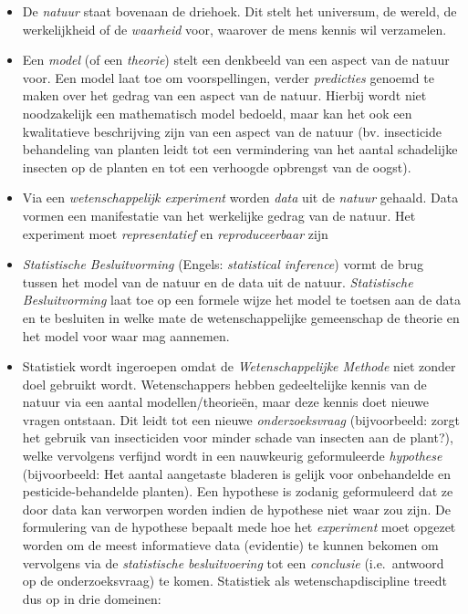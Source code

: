 \documentclass[
  dutch,
  letterpaper,
  12pt]{book}
\theoremstyle{definition}
\theoremstyle{definition}
\theoremstyle{definition}
\theoremstyle{remark}
\begin{document}
\begin{itemize}
\item
  De \emph{natuur} staat bovenaan de driehoek. Dit stelt het universum,
  de wereld, de werkelijkheid of de \emph{waarheid} voor, waarover de
  mens kennis wil verzamelen.
\item
  Een \emph{model} (of een \emph{theorie}) stelt een denkbeeld van een
  aspect van de natuur voor. Een model laat toe om voorspellingen,
  verder \emph{predicties} genoemd te maken over het gedrag van een
  aspect van de natuur. Hierbij wordt niet noodzakelijk een mathematisch
  model bedoeld, maar kan het ook een kwalitatieve beschrijving zijn van
  een aspect van de natuur (bv. insecticide behandeling van planten
  leidt tot een vermindering van het aantal schadelijke insecten op de
  planten en tot een verhoogde opbrengst van de oogst).
\item
  Via een \emph{wetenschappelijk experiment} worden \emph{data} uit de
  \emph{natuur} gehaald. Data vormen een manifestatie van het werkelijke
  gedrag van de natuur. Het experiment moet \emph{representatief} en
  \emph{reproduceerbaar} zijn
\item
  \emph{Statistische Besluitvorming} (Engels: \emph{statistical
  inference}) vormt de brug tussen het model van de natuur en de data
  uit de natuur. \emph{Statistische Besluitvorming} laat toe op een
  formele wijze het model te toetsen aan de data en te besluiten in
  welke mate de wetenschappelijke gemeenschap de theorie en het model
  voor waar mag aannemen.
\item
  Statistiek wordt ingeroepen omdat de \emph{Wetenschappelijke Methode}
  niet zonder doel gebruikt wordt. Wetenschappers hebben gedeeltelijke
  kennis van de natuur via een aantal modellen/theorieën, maar deze
  kennis doet nieuwe vragen ontstaan. Dit leidt tot een nieuwe
  \emph{onderzoeksvraag} (bijvoorbeeld: zorgt het gebruik van
  insecticiden voor minder schade van insecten aan de plant?), welke
  vervolgens verfijnd wordt in een nauwkeurig geformuleerde
  \emph{hypothese} (bijvoorbeeld: Het aantal aangetaste bladeren is
  gelijk voor onbehandelde en pesticide-behandelde planten). Een
  hypothese is zodanig geformuleerd dat ze door data kan verworpen
  worden indien de hypothese niet waar zou zijn. De formulering van de
  hypothese bepaalt mede hoe het \emph{experiment} moet opgezet worden
  om de meest informatieve data (evidentie) te kunnen bekomen om
  vervolgens via de \emph{statistische besluitvoering} tot een
  \emph{conclusie} (i.e.~antwoord op de onderzoeksvraag) te komen.
  Statistiek als wetenschapdiscipline treedt dus op in drie domeinen:


\end{itemize}
\end{document}
